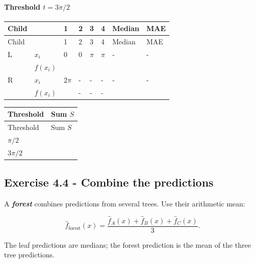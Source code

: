 \documentclass{course_sheet}
\begin{document}
\paragraph*{Threshold $t=3\pi/2$}
\begingroup
\small
\setlength{\tabcolsep}{4pt}
\begin{longtable}{l|l|l|l|l|l|l|l}
Child &  & 1 & 2 & 3 & 4 & Median & MAE \\
\hline
\endfirsthead
Child &  & 1 & 2 & 3 & 4 & Median & MAE \\
\hline
\endhead
L & $x_i$ & $0$ & $0$ & $\pi$ & $\pi$ & - & - \\[3pt]
 & $f(x_i)$ & $\phantom{0}$ & $\phantom{0}$ & $\phantom{0}$ & $\phantom{0}$ & $\phantom{0}$ & $\phantom{0}$ \\[3pt]
R & $x_i$ & $2\pi$ & - & - & - & - & - \\[3pt]
 & $f(x_i)$ & $\phantom{0}$ & - & - & - & $\phantom{0}$ & $\phantom{0}$ \\[3pt]
\end{longtable}
\endgroup
\begingroup
\small
\setlength{\tabcolsep}{4pt}
\begin{longtable}{l|l}
Threshold & Sum $S$ \\
\hline
\endfirsthead
Threshold & Sum $S$ \\
\hline
\endhead
$\pi/2$ & $\phantom{0}$ \\[3pt]
$3\pi/2$ & $\phantom{0}$ \\[3pt]
\end{longtable}
\endgroup
\subsection*{Exercise 4.4 - Combine the predictions}
A \textbf{\textit{forest}} combines predictions from several trees. Use their arithmetic mean:

\[
\hat f_{\mathrm{forest}}(x)=\frac{\hat f_A(x)+\hat f_B(x)+\hat f_C(x)}3.
\]

The leaf predictions are medians; the forest prediction is the mean of the three tree predictions.
\end{document}
